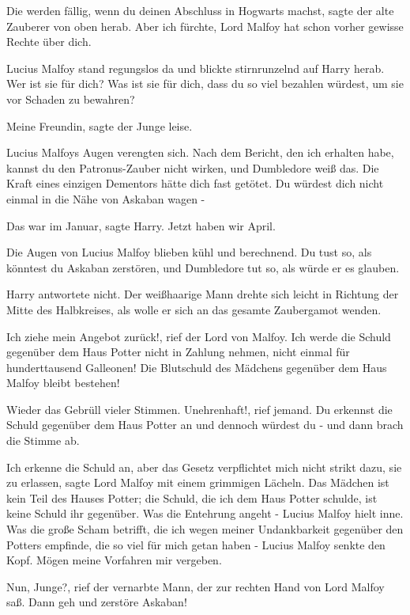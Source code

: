 \glqq Die werden fällig, wenn du deinen Abschluss in Hogwarts machst\grqq{},
sagte der alte Zauberer von oben herab. \glqq Aber ich fürchte, Lord Malfoy hat
schon vorher gewisse Rechte über dich.\grqq{}

Lucius Malfoy stand regungslos da und blickte stirnrunzelnd auf Harry herab.
\glqq Wer ist sie für dich? Was ist sie für dich, dass du so viel bezahlen
würdest, um sie vor Schaden zu bewahren?\grqq{}

\glqq Meine Freundin\grqq{}, sagte der Junge leise.

Lucius Malfoys Augen verengten sich. \glqq Nach dem Bericht, den ich erhalten
habe, kannst du den Patronus-Zauber nicht wirken, und Dumbledore weiß das. Die
Kraft eines einzigen Dementors hätte dich fast getötet. Du würdest dich nicht
einmal in die Nähe von Askaban wagen -\grqq{}

\glqq Das war im Januar\grqq{}, sagte Harry. \glqq Jetzt haben wir April.\grqq{}

Die Augen von Lucius Malfoy blieben kühl und berechnend. \glqq Du tust so, als
könntest du Askaban zerstören, und Dumbledore tut so, als würde er es
glauben.\grqq{}

Harry antwortete nicht. Der weißhaarige Mann drehte sich leicht in Richtung der
Mitte des Halbkreises, als wolle er sich an das gesamte Zaubergamot wenden.

\glqq Ich ziehe mein Angebot zurück!\grqq{}, rief der Lord von Malfoy. \glqq Ich
werde die Schuld gegenüber dem Haus Potter nicht in Zahlung nehmen, nicht einmal
für hunderttausend Galleonen! Die Blutschuld des Mädchens gegenüber dem Haus
Malfoy bleibt bestehen!\grqq{}

Wieder das Gebrüll vieler Stimmen. \glqq Unehrenhaft!\grqq{}, rief jemand. \glqq
Du erkennst die Schuld gegenüber dem Haus Potter an und dennoch würdest du
-\grqq{} und dann brach die Stimme ab.

\glqq Ich erkenne die Schuld an, aber das Gesetz verpflichtet mich nicht strikt
dazu, sie zu erlassen\grqq{}, sagte Lord Malfoy mit einem grimmigen Lächeln.
\glqq Das Mädchen ist kein Teil des Hauses Potter; die Schuld, die ich dem Haus
Potter schulde, ist keine Schuld ihr gegenüber. Was die Entehrung angeht
-\grqq{} Lucius Malfoy hielt inne. \glqq Was die große Scham betrifft, die ich
wegen meiner Undankbarkeit gegenüber den Potters empfinde, die so viel für mich
getan haben -\grqq{} Lucius Malfoy senkte den Kopf. \glqq Mögen meine Vorfahren
mir vergeben.\grqq{}

\glqq Nun, Junge?\grqq{}, rief der vernarbte Mann, der zur rechten Hand von Lord
Malfoy saß. \glqq Dann geh und zerstöre Askaban!\grqq{}


